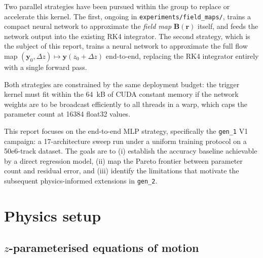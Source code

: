 \documentclass[a4paper,11pt]{article}
\newcommand{\SI}[2]{#1~#2}
\newcommand{\num}[1]{#1}
\newcommand{\kilo}{k}
\newcommand{\byte}{B}
\newcommand{\dz}{\Delta z}
\newcommand{\Bfield}{\mathbf{B}}
\newcommand{\state}{\mathbf{y}}
\begin{document}
Two parallel strategies have been pursued within the group to replace or
accelerate this kernel.  The first, ongoing in
\texttt{experiments/field\_maps/}, trains a compact neural network to
approximate the \emph{field map} $\Bfield(\mathbf{r})$ itself, and feeds
the network output into the existing RK4 integrator.  The second strategy,
which is the subject of this report, trains a neural network to approximate
the full flow map $(\state_0, \dz) \mapsto \state(z_0+\dz)$ end-to-end,
replacing the RK4 integrator entirely with a single forward pass.

Both strategies are constrained by the same deployment budget: the
trigger kernel must fit within the \SI{64}{\kilo\byte} of CUDA constant
memory if the network weights are to be broadcast efficiently to all
threads in a warp, which caps the parameter count at
\num{16384} float32 values.

This report focuses on the end-to-end MLP strategy, specifically the
\texttt{gen\_1} V1 campaign: a 17-architecture sweep run under a uniform
training protocol on a \num{50e6}-track dataset.  The goals are to (i)
establish the accuracy baseline achievable by a direct regression model,
(ii) map the Pareto frontier between parameter count and residual error,
and (iii) identify the limitations that motivate the subsequent
physics-informed extensions in \texttt{gen\_2}.

\section{Physics setup}\label{gen1:sec:physics}

\subsection{$z$-parameterised equations of motion}
\end{document}
